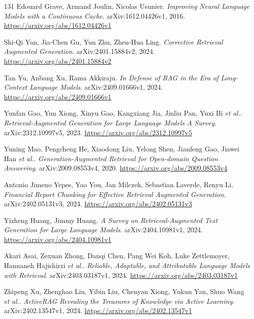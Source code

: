 \documentclass[11pt,a4paper]{article}
\begin{document}
\begin{thebibliography}{131}
Edouard Grave, Armand Joulin, Nicolas Usunier.
\newblock \emph{Improving Neural Language Models with a Continuous Cache}.
\newblock arXiv:1612.04426v1, 2016.
\newblock \url{https://arxiv.org/abs/1612.04426v1}

Shi-Qi Yan, Jia-Chen Gu, Yun Zhu, Zhen-Hua Ling.
\newblock \emph{Corrective Retrieval Augmented Generation}.
\newblock arXiv:2401.15884v2, 2024.
\newblock \url{https://arxiv.org/abs/2401.15884v2}

Tan Yu, Anbang Xu, Rama Akkiraju.
\newblock \emph{In Defense of RAG in the Era of Long-Context Language Models}.
\newblock arXiv:2409.01666v1, 2024.
\newblock \url{https://arxiv.org/abs/2409.01666v1}

Yunfan Gao, Yun Xiong, Xinyu Gao, Kangxiang Jia, Jinliu Pan, Yuxi Bi \emph{et al.}.
\newblock \emph{Retrieval-Augmented Generation for Large Language Models A Survey}.
\newblock arXiv:2312.10997v5, 2023.
\newblock \url{https://arxiv.org/abs/2312.10997v5}

Yuning Mao, Pengcheng He, Xiaodong Liu, Yelong Shen, Jianfeng Gao, Jiawei Han \emph{et al.}.
\newblock \emph{Generation-Augmented Retrieval for Open-domain Question Answering}.
\newblock arXiv:2009.08553v4, 2020.
\newblock \url{https://arxiv.org/abs/2009.08553v4}

Antonio Jimeno Yepes, Yao You, Jan Milczek, Sebastian Laverde, Renyu Li.
\newblock \emph{Financial Report Chunking for Effective Retrieval Augmented Generation}.
\newblock arXiv:2402.05131v3, 2024.
\newblock \url{https://arxiv.org/abs/2402.05131v3}

Yizheng Huang, Jimmy Huang.
\newblock \emph{A Survey on Retrieval-Augmented Text Generation for Large Language Models}.
\newblock arXiv:2404.10981v1, 2024.
\newblock \url{https://arxiv.org/abs/2404.10981v1}

Akari Asai, Zexuan Zhong, Danqi Chen, Pang Wei Koh, Luke Zettlemoyer, Hannaneh Hajishirzi \emph{et al.}.
\newblock \emph{Reliable, Adaptable, and Attributable Language Models with Retrieval}.
\newblock arXiv:2403.03187v1, 2024.
\newblock \url{https://arxiv.org/abs/2403.03187v1}

Zhipeng Xu, Zhenghao Liu, Yibin Liu, Chenyan Xiong, Yukun Yan, Shuo Wang \emph{et al.}.
\newblock \emph{ActiveRAG Revealing the Treasures of Knowledge via Active Learning}.
\newblock arXiv:2402.13547v1, 2024.
\newblock \url{https://arxiv.org/abs/2402.13547v1}


\end{thebibliography}
\end{document}
